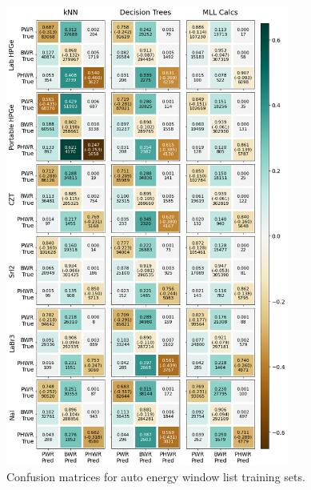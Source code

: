 \begin{figure}[!htbp]
  \centering
  \includegraphics[width=0.83\textwidth]{./chapters/exp2/confusion_matrix_6dets_auto.png}
  \caption{Confusion matrices for auto energy window list training sets.}
  \label{fig:cm_auto}
\end{figure}

